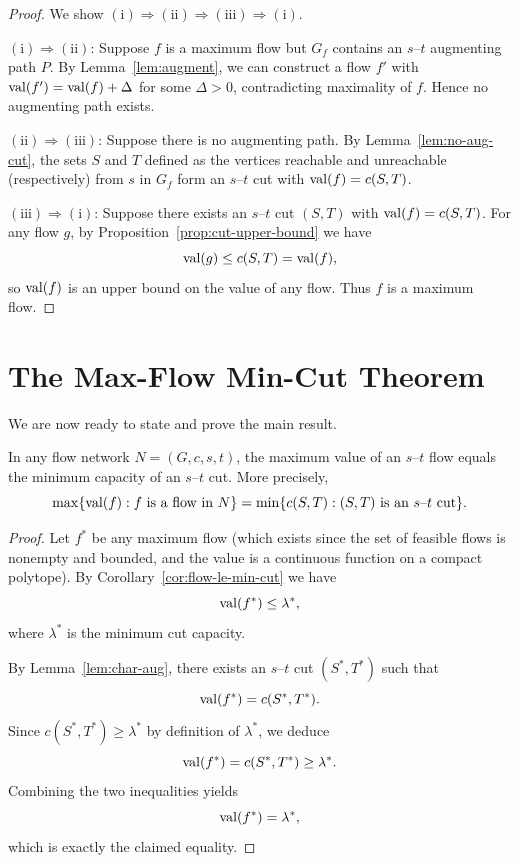 \documentclass[11pt]{article}
\begin{document}
\begin{proof}
We show $(\mathrm{i})\Rightarrow(\mathrm{ii})\Rightarrow(\mathrm{iii})\Rightarrow(\mathrm{i})$.

\medskip\noindent
$(\mathrm{i})\Rightarrow(\mathrm{ii})$: Suppose $f$ is a maximum flow but
$G_f$ contains an $s$--$t$ augmenting path $P$. By Lemma~\ref{lem:augment},
we can construct a flow $f'$ with $\mathrm{val}(f') = \mathrm{val}(f)+\Delta$ for some
$\Delta>0$, contradicting maximality of $f$. Hence no augmenting path exists.

\medskip\noindent
$(\mathrm{ii})\Rightarrow(\mathrm{iii})$: Suppose there is no augmenting path.
By Lemma~\ref{lem:no-aug-cut}, the sets $S$ and $T$ defined as the vertices
reachable and unreachable (respectively) from $s$ in $G_f$ form an $s$--$t$
cut with $\mathrm{val}(f)=c(S,T)$.

\medskip\noindent
$(\mathrm{iii})\Rightarrow(\mathrm{i})$: Suppose there exists an $s$--$t$ cut
$(S,T)$ with $\mathrm{val}(f)=c(S,T)$. For any flow $g$, by
Proposition~\ref{prop:cut-upper-bound} we have
\[
  \mathrm{val}(g) \le c(S,T) = \mathrm{val}(f),
\]
so $\mathrm{val}(f)$ is an upper bound on the value of any flow. Thus $f$ is a maximum
flow.
\end{proof}

\section{The Max-Flow Min-Cut Theorem}

We are now ready to state and prove the main result.

\begin{theorem}\label{thm:mfmc}
In any flow network $N=(G,c,s,t)$, the maximum value of an $s$--$t$ flow equals
the minimum capacity of an $s$--$t$ cut. More precisely,
\[
  \max\{ \mathrm{val}(f) : f \text{ is a flow in }N\}
  =
  \min\{ c(S,T) : (S,T) \text{ is an $s$--$t$ cut} \}.
\]
\end{theorem}

\begin{proof}
Let $f^*$ be any maximum flow (which exists since the set of feasible flows is
nonempty and bounded, and the value is a continuous function on a compact
polytope). By Corollary~\ref{cor:flow-le-min-cut} we have
\[
  \mathrm{val}(f^*) \le \lambda^*,
\]
where $\lambda^*$ is the minimum cut capacity.

By Lemma~\ref{lem:char-aug}, there exists an $s$--$t$ cut $(S^*,T^*)$ such that
\[
  \mathrm{val}(f^*) = c(S^*,T^*).
\]
Since $c(S^*,T^*) \ge \lambda^*$ by definition of $\lambda^*$, we deduce
\[
  \mathrm{val}(f^*) = c(S^*,T^*) \ge \lambda^*.
\]
Combining the two inequalities yields
\[
  \mathrm{val}(f^*) = \lambda^*,
\]
which is exactly the claimed equality.
\end{proof}
\end{document}
